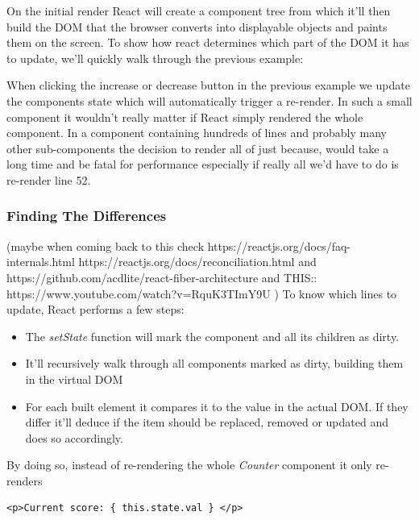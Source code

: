 On the initial render React will create a component tree from which it'll then build the DOM that the browser converts into displayable objects and paints them on the screen. To show how react determines which part of the DOM it has to update, we'll quickly walk through the previous example:

When clicking the increase or decrease button in the previous example we update the components state which will automatically trigger a re-render. In such a small component it wouldn't really matter if React simply rendered the whole component. In a component containing hundreds of lines and probably many other sub-components the decision to render all of just because, would take a long time and be fatal for performance especially if really all we'd have to do is re-render line 52.

\subsubsection{Finding The Differences} (maybe when coming back to this check https://reactjs.org/docs/faq-internals.html https://reactjs.org/docs/reconciliation.html and https://github.com/acdlite/react-fiber-architecture  and THIS:: https://www.youtube.com/watch?v=RquK3TImY9U )
To know which lines to update, React performs a few steps: 
\begin{itemize}
\item The \emph{setState} function will mark the component and all its children as dirty. \cite{GethylGeorgeKurian}
\item It'll recursively walk through all components marked as dirty, building them in the virtual DOM
\item For each built element it compares it to the value in the actual DOM. If they differ it'll deduce if the item should be replaced, removed or updated and does so accordingly. 
\end{itemize}
By doing so, instead of re-rendering the whole \emph{Counter} component it only re-renders
\begin{lstlisting}
<p>Current score: { this.state.val } </p>
\end{lstlisting}

